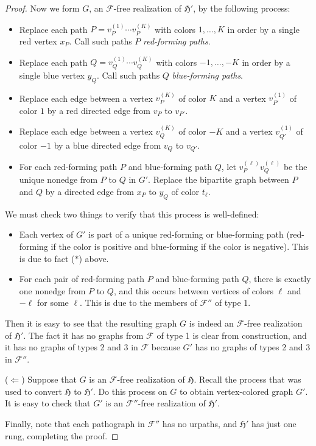 \documentclass{article}
\newcommand{\Fc}{\mathcal{F}}
\newcommand{\Hf}{\mathfrak{H}}
\begin{document}
\begin{proof}
Now we form $G$, an $\Fc$-free realization of $\Hf'$, by the following process:
\begin{itemize}
    \item Replace each path $P=v_P^{(1)}\cdots v_P^{(K)}$ with colors $1,\dots,K$ in order by a single red vertex $x_P$. Call such paths $P$ \textit{red-forming paths}.
    \item Replace each path $Q=v_Q^{(1)}\cdots v_Q^{(K)}$ with colors $-1,\dots,-K$ in order by a single blue vertex $y_Q$. Call such paths $Q$ \textit{blue-forming paths}.
    \item Replace each edge between a vertex $v_P^{(K)}$ of color $K$ and a vertex $v_{P'}^{(1)}$ of color $1$ by a red directed edge from $v_P$ to $v_{P'}$.
    \item Replace each edge between a vertex $v_Q^{(K)}$ of color $-K$ and a vertex $v_{Q'}^{(1)}$ of color $-1$ by a blue directed edge from $v_Q$ to $v_{Q'}$.
    \item For each red-forming path $P$ and blue-forming path $Q$, let $v_P^{(\ell)}v_Q^{(\ell)}$ be the unique nonedge from $P$ to $Q$ in $G'$. Replace the bipartite graph between $P$ and $Q$ by a directed edge from $x_P$ to $y_Q$ of color $t_\ell$.
\end{itemize}
We must check two things to verify that this process is well-defined:
\begin{itemize}
    \item Each vertex of $G'$ is part of a unique red-forming or blue-forming path (red-forming if the color is positive and blue-forming if the color is negative). This is due to fact ($*$) above.
    \item For each pair of red-forming path $P$ and blue-forming path $Q$, there is exactly one nonedge from $P$ to $Q$, and this occurs between vertices of colors $\ell$ and $-\ell$ for some $\ell$. This is due to the members of $\Fc''$ of type 1.
\end{itemize}
Then it is easy to see that the resulting graph $G$ is indeed an $\Fc$-free realization of $\Hf'$. The fact it has no graphs from $\Fc$ of type 1 is clear from construction, and it has no graphs of types 2 and 3 in $\Fc$ because $G'$ has no graphs of types 2 and 3 in $\Fc''$.

($\Leftarrow$) Suppose that $G$ is an $\Fc$-free realization of $\Hf$. Recall the process that was used to convert $\Hf$ to $\Hf'$. Do this process on $G$ to obtain vertex-colored graph $G'$. It is easy to check that $G'$ is an $\Fc''$-free realization of $\Hf'$.

Finally, note that each pathograph in $\Fc''$ has no urpaths, and $\Hf'$ has just one rung, completing the proof.
\end{proof}
\end{document}
